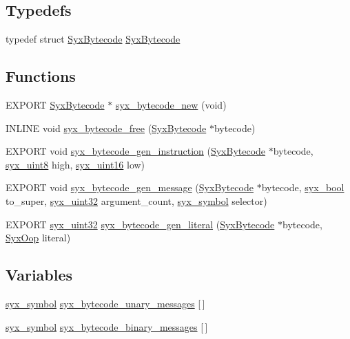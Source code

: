 \subsection*{Typedefs}
\begin{CompactItemize}
\item 
typedef struct \hyperlink{struct_syx_bytecode}{SyxBytecode} \hyperlink{syx-bytecode_8h_ddefdc0e904f306046ea2d02b89f5f97}{SyxBytecode}
\end{CompactItemize}
\subsection*{Functions}
\begin{CompactItemize}
\item 
EXPORT \hyperlink{struct_syx_bytecode}{SyxBytecode} $\ast$ \hyperlink{syx-bytecode_8h_e034d74f4bcb6913a9b807e87f534b8a}{syx\_\-bytecode\_\-new} (void)
\item 
INLINE void \hyperlink{syx-bytecode_8h_0a5a5bc160ebdb86668efd589066c390}{syx\_\-bytecode\_\-free} (\hyperlink{struct_syx_bytecode}{SyxBytecode} $\ast$bytecode)
\item 
EXPORT void \hyperlink{syx-bytecode_8h_5377d7f12378a8c64ef0b01d1adbe1b2}{syx\_\-bytecode\_\-gen\_\-instruction} (\hyperlink{struct_syx_bytecode}{SyxBytecode} $\ast$bytecode, \hyperlink{syx-types_8h_7cb1870b8124a88e807c98f315f3d923}{syx\_\-uint8} high, \hyperlink{syx-types_8h_5c0caeeeb45b4575061ab7f368f10337}{syx\_\-uint16} low)
\item 
EXPORT void \hyperlink{syx-bytecode_8h_e40b3f23b473b3006cea4818dbdf507d}{syx\_\-bytecode\_\-gen\_\-message} (\hyperlink{struct_syx_bytecode}{SyxBytecode} $\ast$bytecode, \hyperlink{syx-types_8h_c6dc09b276b99fa1956364359139daab}{syx\_\-bool} to\_\-super, \hyperlink{syx-types_8h_eb2d8221bf07737360750e4c0ec66a99}{syx\_\-uint32} argument\_\-count, \hyperlink{syx-types_8h_9663af54b7b72f5d8be5f754ef356525}{syx\_\-symbol} selector)
\item 
EXPORT \hyperlink{syx-types_8h_eb2d8221bf07737360750e4c0ec66a99}{syx\_\-uint32} \hyperlink{syx-bytecode_8h_61cd2891a6644ee01481a4d43271efb9}{syx\_\-bytecode\_\-gen\_\-literal} (\hyperlink{struct_syx_bytecode}{SyxBytecode} $\ast$bytecode, \hyperlink{syx-types_8h_1121caba2d40b2ce090b640762744ccd}{SyxOop} literal)
\end{CompactItemize}
\subsection*{Variables}
\begin{CompactItemize}
\item 
\hyperlink{syx-types_8h_9663af54b7b72f5d8be5f754ef356525}{syx\_\-symbol} \hyperlink{syx-bytecode_8h_2d5efd1c4984dc8e4a86ac7062a41716}{syx\_\-bytecode\_\-unary\_\-messages} \mbox{[}$\,$\mbox{]}
\item 
\hyperlink{syx-types_8h_9663af54b7b72f5d8be5f754ef356525}{syx\_\-symbol} \hyperlink{syx-bytecode_8h_90d7e46b6b031c996ce7cc81083a6fa7}{syx\_\-bytecode\_\-binary\_\-messages} \mbox{[}$\,$\mbox{]}
\end{CompactItemize}


